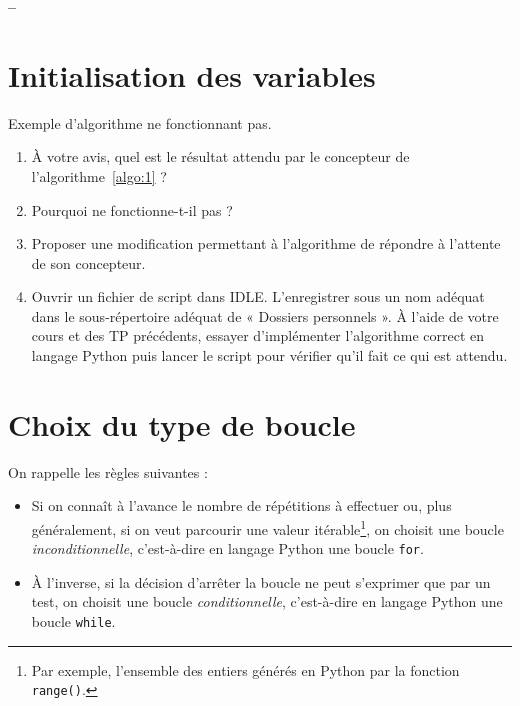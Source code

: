 

%



\begin{center}
{\Large\bf {\type} \no {\numero} -- \descrip}
\end{center}


\section{Initialisation des variables}

\begin{algorithm}[H]

\caption{Exemple d'algorithme ne fonctionnant pas.}
\label{algo:1}
\end{algorithm}

\begin{enumerate}
 \item À votre avis, quel est le résultat attendu par le concepteur de l'algorithme~\ref{algo:1} ?
 
 \item Pourquoi ne fonctionne-t-il pas ?
 
 \item Proposer une modification permettant à l'algorithme de répondre à  l'attente de son concepteur.
 
 \item Ouvrir un fichier de script dans IDLE. L'enregistrer sous un nom adéquat dans le sous-répertoire adéquat de « Dossiers personnels ». À l'aide de votre cours et des TP précédents, essayer d'implémenter l'algorithme correct en langage Python puis lancer le script pour vérifier qu'il fait ce qui est attendu.
 
\end{enumerate}

\section{Choix du type de boucle}

On rappelle les règles suivantes :
\begin{itemize}
 \item Si on connaît à l'avance le nombre de répétitions à effectuer ou, plus généralement, si on veut parcourir une valeur itérable\footnote{Par exemple, l'ensemble des entiers générés en Python par la fonction \texttt{range()}.}, on choisit une boucle \textit{inconditionnelle}, c'est-à-dire en langage Python une boucle \texttt{for}.
 
 \item À l'inverse, si la décision d'arrêter la boucle ne peut s'exprimer que par un test, on choisit une boucle \textit{conditionnelle}, c'est-à-dire en langage Python une boucle \texttt{while}.

\end{itemize}

